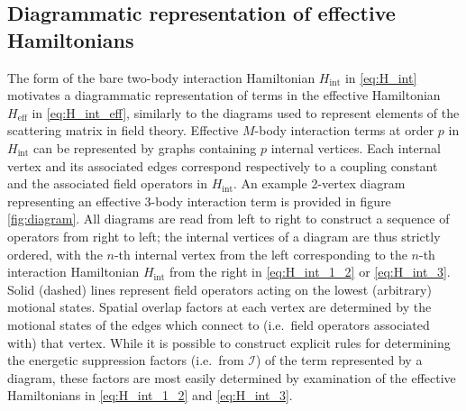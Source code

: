 \documentclass[preprint,showkeys,nofootinbib]{revtex4-1}
\renewcommand{\t}{\text} %
\newcommand{\I}{\mathcal{I}}
\newcommand{\1}{\mathds{1}}
\begin{document}
\subsection{Diagrammatic representation of effective Hamiltonians}

The form of the bare two-body interaction Hamiltonian $H_{\t{int}}$ in
\eqref{eq:H_int} motivates a diagrammatic representation of terms in
the effective Hamiltonian $H_{\t{eff}}$ in \eqref{eq:H_int_eff},
similarly to the diagrams used to represent elements of the scattering
matrix in field theory.  Effective $M$-body interaction terms at order
$p$ in $H_{\t{int}}$ can be represented by graphs containing $p$
internal vertices.  Each internal vertex and its associated edges
correspond respectively to a coupling constant and the associated
field operators in $H_{\t{int}}$.  An example 2-vertex diagram
representing an effective 3-body interaction term is provided in
figure \ref{fig:diagram}.  All diagrams are read from left to right to
construct a sequence of operators from right to left; the internal
vertices of a diagram are thus strictly ordered, with the $n$-th
internal vertex from the left corresponding to the $n$-th interaction
Hamiltonian $H_{\t{int}}$ from the right in \eqref{eq:H_int_1_2} or
\eqref{eq:H_int_3}.  Solid (dashed) lines represent field operators
acting on the lowest (arbitrary) motional states.  Spatial overlap
factors at each vertex are determined by the motional states of the
edges which connect to (i.e.~field operators associated with) that
vertex.  While it is possible to construct explicit rules for
determining the energetic suppression factors (i.e.~from $\I$) of the
term represented by a diagram, these factors are most easily
determined by examination of the effective Hamiltonians in
\eqref{eq:H_int_1_2} and \eqref{eq:H_int_3}.
\end{document}
